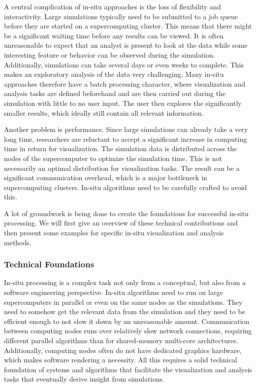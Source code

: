 %
A central complication of in-situ approaches is the loss of flexibility and
interactivity.
%
Large simulations typically need to be submitted to a job queue before they are
started on a supercomputing cluster.
%
This means that there might be a significant waiting time before any results can
be viewed.
%
It is often unreasonable to expect that an analyst is present to look at the
data while some interesting feature or behavior can be observed during the
simulation.
%
Additionally, simulations can take several days or even weeks to complete.
%
This makes an exploratory analysis of the data very challenging.
%
Many in-situ approaches therefore have a batch processing character, where
visualization and analysis tasks are defined beforehand and are then
carried out during the simulation with little to no user input.
%
The user then explores the significantly smaller results, which ideally still
contain all relevant information.
%

%
Another problem is performance.
%
Since large simulations can already take a very long time, researchers are
reluctant to accept a significant increase in computing time in return for
visualization.
%
The simulation data is distributed across the nodes of the supercomputer to
optimize the simulation time.
%
This is not necessarily an optimal distribution for visualization tasks.
%
The result can be a significant communication overhead, which is a major
bottleneck in supercomputing clusters.
%
In-situ algorithms need to be carefully crafted to avoid this.
%

%
A lot of groundwork is being done to create the foundations for successful
in-situ processing.
%
We will first give an overview of these technical contributions and then present
some examples for specific in-situ visualization and analysis methods.
%
\subsubsection{Technical Foundations} %
\label{ssub:technical_foundations}
%
In-situ processing is a complex task not only from a conceptual, but also from a
software engineering perspective.
%
In-situ algorithms need to run on large supercomputers in parallel or even on
the same nodes as the simulations.
%
They need to somehow get the relevant data from the simulation and they need to
be efficient enough to not slow it down by an unreasonable amount.
%
Communication between computing nodes runs over relatively slow network
connections, requiring different parallel algorithms than for shared-memory
multi-core architectures.
%
Additionally, computing nodes often do not have dedicated graphics hardware,
which makes software rendering a necessity.
%
All this requires a solid technical foundation of systems and algorithms that
facilitate the visualization and analysis tasks that eventually derive insight
from simulations.
%


